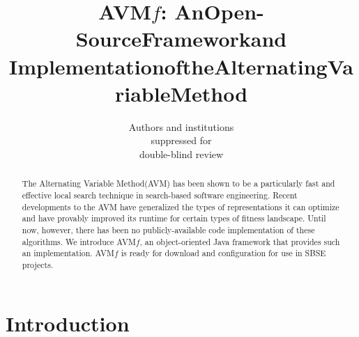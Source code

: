 \documentclass{llncs}
\newcommand{\AVM}{Alternating Variable Method\xspace}
\newcommand{\name}{AVM\hspace{-1pt}$f$\xspace}
\begin{document}
\title{\texorpdfstring{\name: An\:Open-Source\:Framework\:and\\$\!$Implementation\:of\:the\:Alternating\:Variable\:Method\vspace{-.5em}}{}}



\author{
	Authors and institutions\\
	suppressed for\\
	\vspace{1mm} \small{double-blind review}
	\vspace{-2em}
}
\institute{}

\maketitle

\begin{abstract}
The \AVM (AVM) has been shown to be a particularly fast and effective local search technique in search-based software engineering. %
%
Recent developments to the AVM have generalized the types of representations it can optimize and have provably improved its runtime for certain types of fitness landscape. Until now, however, there has been no publicly-available code implementation of these algorithms. We introduce \name, an object-oriented Java framework that provides such an implementation. \name is ready for download and configuration for use in SBSE projects.

\end{abstract}

\section{Introduction}
\end{document}
